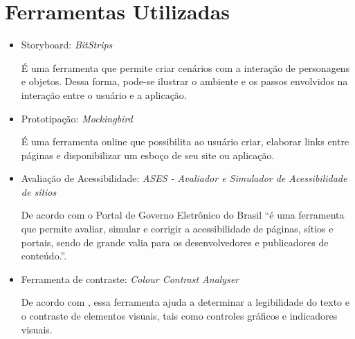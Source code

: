 \chapter[Ferramentas]{Ferramentas Utilizadas}

\begin{itemize}
  \item Storyboard: \textit{BitStrips}
  
  \subitem É uma ferramenta que permite criar cenários com a interação de personagens e objetos. Dessa forma, pode-se ilustrar o ambiente e os passos envolvidos na interação entre o usuário e a aplicação.
  
  \item Prototipação: \textit{Mockingbird}
  
  \subitem É uma ferramenta online que possibilita ao usuário criar, elaborar links entre páginas e disponibilizar um esboço de seu site ou aplicação.
  
  \item Avaliação de Acessibilidade: \textit{ASES - Avaliador e Simulador de Acessibilidade de sítios}
  
  \subitem De acordo com o Portal de Governo Eletrônico	do Brasil “é uma ferramenta que permite avaliar, simular e corrigir a acessibilidade de páginas, sítios e 
  portais, sendo de grande valia para os desenvolvedores e publicadores de conteúdo.”. \cite{brasil} 
  
  \item Ferramenta de contraste: \textit{Colour Contrast Analyser}
  
  \subitem De acordo com , essa ferramenta ajuda a determinar a legibilidade do texto e o 
  contraste de elementos visuais, tais como controles gráficos e indicadores visuais.
\end{itemize}

